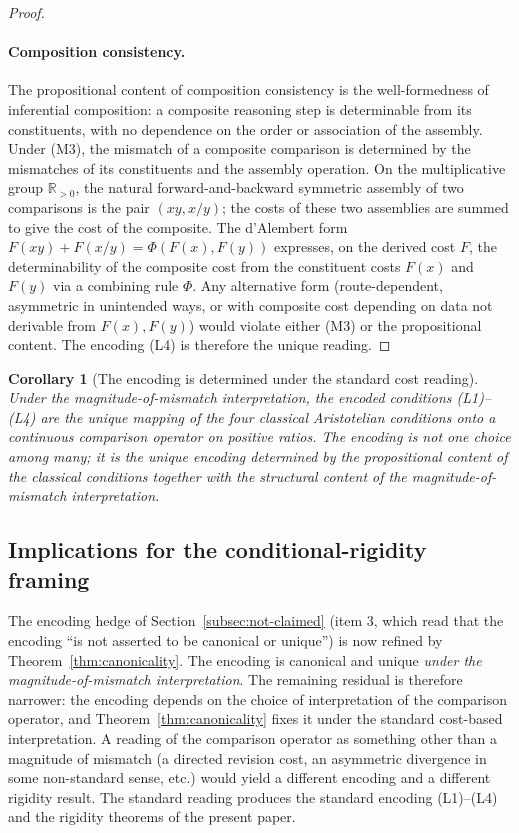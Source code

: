 \documentclass[11pt,a4paper]{article}
\newtheorem{corollary}[theorem]{Corollary}
\theoremstyle{definition}
\theoremstyle{remark}
\begin{document}
\begin{proof}
\paragraph{Composition consistency.} The propositional content of
composition consistency is the well-formedness of inferential
composition: a composite reasoning step is determinable from its
constituents, with no dependence on the order or association of the
assembly. Under (M3), the mismatch of a composite comparison is
determined by the mismatches of its constituents and the assembly
operation. On the multiplicative group $\mathbb{R}_{>0}$, the natural
forward-and-backward symmetric assembly of two comparisons is the
pair $(xy, x/y)$; the costs of these two assemblies are summed to
give the cost of the composite. The d'Alembert form
$F(xy) + F(x/y) = \Phi(F(x), F(y))$ expresses, on the derived cost
$F$, the determinability of the composite cost from the constituent
costs $F(x)$ and $F(y)$ via a combining rule $\Phi$. Any alternative
form (route-dependent, asymmetric in unintended ways, or with
composite cost depending on data not derivable from $F(x), F(y)$)
would violate either (M3) or the propositional content. The encoding
(L4) is therefore the unique reading.
\end{proof}

\begin{corollary}[The encoding is determined under the standard cost reading]
\label{cor:encoding-determined}
Under the magnitude-of-mismatch interpretation, the encoded conditions
(L1)--(L4) are the unique mapping of the four classical Aristotelian
conditions onto a continuous comparison operator on positive ratios.
The encoding is not one choice among many; it is the unique encoding
determined by the propositional content of the classical conditions
together with the structural content of the magnitude-of-mismatch
interpretation.
\end{corollary}

\subsection{Implications for the conditional-rigidity framing}

The encoding hedge of Section~\ref{subsec:not-claimed} (item 3, which
read that the encoding ``is not asserted to be canonical or unique'')
is now refined by Theorem~\ref{thm:canonicality}. The encoding is
canonical and unique \emph{under the magnitude-of-mismatch
interpretation}. The remaining residual is therefore narrower: the
encoding depends on the choice of interpretation of the comparison
operator, and Theorem~\ref{thm:canonicality} fixes it under the
standard cost-based interpretation. A reading of the comparison
operator as something other than a magnitude of mismatch (a directed
revision cost, an asymmetric divergence in some non-standard sense,
etc.) would yield a different encoding and a different rigidity
result. The standard reading produces the standard encoding (L1)--(L4)
and the rigidity theorems of the present paper.
\end{document}
